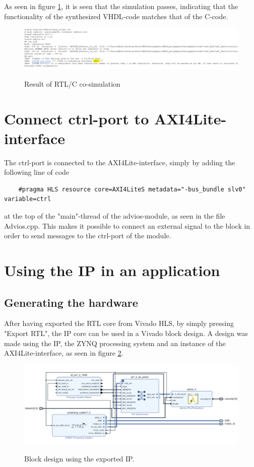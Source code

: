 As seen in figure \ref{fig:7_cosim_res}, it is seen that the simulation passes, indicating that the functionality of the synthesized VHDL-code matches that of the C-code.

\begin{figure}[b]
	\centering
	{\includegraphics[scale=0.5]{Images/2_7_cosim_res.png}}\\[0.5cm]
	\label{fig:7_cosim_res}
	\caption{Result of RTL/C co-simulation}
\end{figure}

\section{Connect ctrl-port to AXI4Lite-interface}
The ctrl-port is connected to the AXI4Lite-interface, simply by adding the following line of code

\begin{lstlisting}
	#pragma HLS resource core=AXI4LiteS metadata="-bus_bundle slv0" variable=ctrl
\end{lstlisting}
at the top of the "main"-thread of the advios-module, as seen in the file Advios.cpp.
This makes it possible to connect an external signal to the block in order to send messages to the ctrl-port of the module.

\section{Using the IP in an application}
\subsection{Generating the hardware}
After having exported the RTL core from Vivado HLS, by simply pressing "Export RTL", the IP core can be used in a Vivado block design. A design was made using the IP, the ZYNQ processing system and an instance of the AXI4Lite-interface, as seen in figure \ref{fig:2_7_BD}.

\begin{figure}[b]
\centering
{\includegraphics[scale=0.5]{Images/2_7_bd.png}}\\[0.5cm]
\label{fig:2_7_BD}
\caption{Block design using the exported IP.}
\end{figure}

